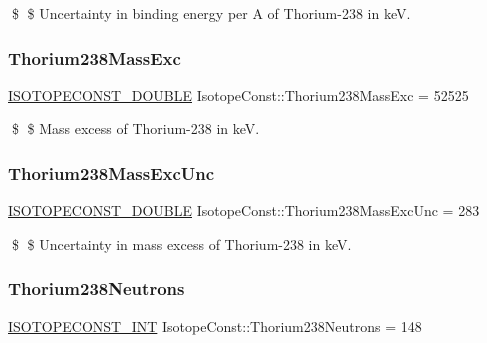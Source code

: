 \$ \$ Uncertainty in binding energy per A of Thorium-\/238 in keV. \mbox{\label{group___isotope_const-_thorium-_th238_gac78fecc1572be6c16b3942db8cfff186}} 
\subsubsection{\texorpdfstring{Thorium238\+Mass\+Exc}{Thorium238MassExc}}
{\footnotesize\ttfamily \mbox{\hyperlink{group___isotope_const-_macros_ga8f45a7272ce02c0b4c65c44636ed719a}{I\+S\+O\+T\+O\+P\+E\+C\+O\+N\+S\+T\+\_\+\+D\+O\+U\+B\+LE}} Isotope\+Const\+::\+Thorium238\+Mass\+Exc = 52525}

\$ \$ Mass excess of Thorium-\/238 in keV. \mbox{\label{group___isotope_const-_thorium-_th238_ga75f6af3b5ffeb62fca3881097d95232b}} 
\subsubsection{\texorpdfstring{Thorium238\+Mass\+Exc\+Unc}{Thorium238MassExcUnc}}
{\footnotesize\ttfamily \mbox{\hyperlink{group___isotope_const-_macros_ga8f45a7272ce02c0b4c65c44636ed719a}{I\+S\+O\+T\+O\+P\+E\+C\+O\+N\+S\+T\+\_\+\+D\+O\+U\+B\+LE}} Isotope\+Const\+::\+Thorium238\+Mass\+Exc\+Unc = 283}

\$ \$ Uncertainty in mass excess of Thorium-\/238 in keV. \mbox{\label{group___isotope_const-_thorium-_th238_gac576c65ce14e1b4c9653b7f9c7907502}} 
\subsubsection{\texorpdfstring{Thorium238\+Neutrons}{Thorium238Neutrons}}
{\footnotesize\ttfamily \mbox{\hyperlink{group___isotope_const-_macros_ga5f18360b3e99483a35c32d789e62621c}{I\+S\+O\+T\+O\+P\+E\+C\+O\+N\+S\+T\+\_\+\+I\+NT}} Isotope\+Const\+::\+Thorium238\+Neutrons = 148}

